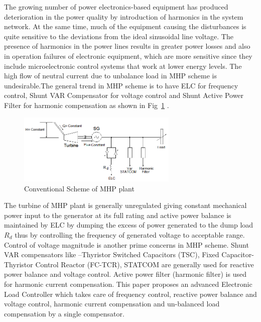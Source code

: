 \documentclass[journal,twoside]{IEEEtran}
\begin{document}
\bigskip
The growing number of power electronics-based equipment
has produced deterioration in the power quality by introduction
of harmonics in the system network. At the same time, much of
the equipment causing the disturbances is quite sensitive to the
deviations from the ideal sinusoidal line voltage\cite{2}. The
presence of harmonics in the power lines results in greater
power losses and also in operation failures of electronic equipment, which
are more sensitive since they include microelectronic control
systems that work at lower energy levels. The high
flow of neutral current due to unbalance load in MHP scheme
is undesirable.The general trend in MHP scheme is to have ELC
for frequency control, Shunt VAR Compensator for voltage
control and Shunt Active Power Filter for harmonic
compensation as shown in Fig~\ref{f1} \cite{2}.

\begin{figure}[!ht]
\centering
\includegraphics[width=3in]{1}
\caption{Conventional Scheme of MHP plant}
\label{f1}
\end{figure}

\bigskip
The turbine of MHP plant is generally unregulated giving
constant mechanical power input to the generator at its full
rating and active power balance is maintained by ELC by
dumping the excess of power generated to the dump load $R_d$ 
thus by controlling the frequency of generated voltage to
acceptable range. Control of voltage magnitude is another
prime concerns in MHP scheme. Shunt VAR compensators like
–Thyristor Switched Capacitors (TSC), Fixed Capacitor-
Thyristor Control Reactor (FC-TCR), STATCOM are generally
used for reactive power balance and voltage control. Active
power filter (harmonic filter) is used for harmonic current
compensation. This paper proposes an advanced Electronic
Load Controller which takes care of frequency control,
reactive power balance and voltage control, harmonic current
compensation and un-balanced load compensation by a single
compensator.
\end{document}

